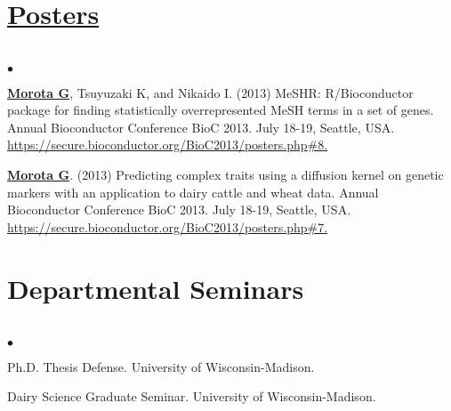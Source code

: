 \documentclass[margin,line,10pt]{res}
\newenvironment{list2}{
  \begin{list}{$\bullet$}{%
      \setlength{\itemsep}{0in}
      \setlength{\parsep}{0in} \setlength{\parskip}{0in}
      \setlength{\topsep}{0in} \setlength{\partopsep}{0in} 
      \setlength{\leftmargin}{0.2in}}}{\end{list}}
\begin{document}
\begin{resume}
\vspace{0.5cm}
\section{ \underline{\textnormal{Posters}} }
\section{}
\begin{list2}
\item   {\bf \underline{Morota G}}, Tsuyuzaki K, and Nikaido I.  (2013)  MeSHR: R/Bioconductor package for finding  
     statistically overrepresented  MeSH terms in a set of genes. 
     Annual Bioconductor Conference BioC 2013. July 18-19, Seattle, USA. 
     \textcolor{blue}{\href{https://secure.bioconductor.org/BioC2013/posters.php\#7}{https://secure.bioconductor.org/BioC2013/posters.php\#8. } }  

\vspace{0.5cm}

\item   {\bf \underline{Morota G}}.  (2013) Predicting complex traits using a diffusion kernel on genetic markers 
     with an application to dairy cattle and wheat data. 
     Annual Bioconductor Conference BioC 2013. July 18-19, Seattle, USA. 
 \textcolor{blue}{\href{https://secure.bioconductor.org/BioC2013/posters.php\#7}{https://secure.bioconductor.org/BioC2013/posters.php\#7. } }  
\end{list2}











\vspace{0.5cm}
\section{\sc Departmental Seminars}
\vspace{1cm}
\section{}
\begin{list2}
\item  Ph.D. Thesis Defense. University of Wisconsin-Madison.
\vspace{0.25cm}
\item  Dairy Science Graduate Seminar. University of Wisconsin-Madison.
\end{list2}  

\end{resume}
\end{document}
